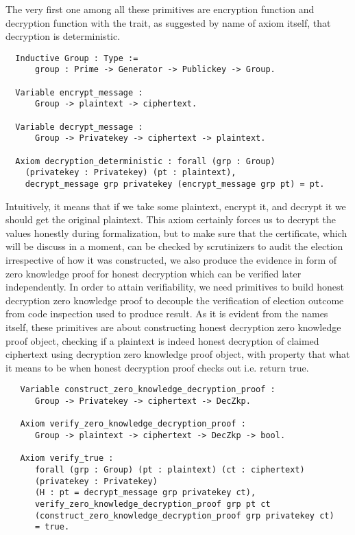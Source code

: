 \documentclass{llncs}
\begin{document}
 The very first one among all these primitives 
are encryption function and decryption function with the trait, as suggested 
by name of axiom itself, that decryption is deterministic. 

\begin{verbatim}
  Inductive Group : Type :=
      group : Prime -> Generator -> Publickey -> Group. 

  Variable encrypt_message :
      Group -> plaintext -> ciphertext.
      
  Variable decrypt_message :
      Group -> Privatekey -> ciphertext -> plaintext.
 
  Axiom decryption_deterministic : forall (grp : Group) 
    (privatekey : Privatekey) (pt : plaintext), 
    decrypt_message grp privatekey (encrypt_message grp pt) = pt.
 \end{verbatim}
 
 Intuitively, it means that if we take some plaintext, encrypt it, and decrypt it 
 we should get the original plaintext. This axiom certainly forces us to decrypt
  the values 
 honestly during formalization, but to make sure that the certificate, which 
 will be discuss in a moment, can be checked 
 by scrutinizers to audit the election irrespective of how it was constructed, 
 we also produce the evidence in form of zero knowledge proof for honest decryption which
 can be verified later independently. In order to attain verifiability, 
 we need primitives to build 
 honest decryption zero knowledge proof to decouple the verification of election 
 outcome from code inspection used to produce result.
 As it is evident from the names itself, these primitives are about constructing honest
 decryption zero knowledge proof object, checking if a plaintext is indeed 
 honest decryption of claimed ciphertext using decryption zero knowledge proof object, 
 with property that what it means to be when honest decryption proof 
 checks out i.e. return true.
 
 \begin{verbatim}
   Variable construct_zero_knowledge_decryption_proof :
      Group -> Privatekey -> ciphertext -> DecZkp.

   Axiom verify_zero_knowledge_decryption_proof :
      Group -> plaintext -> ciphertext -> DecZkp -> bool. 
   
   Axiom verify_true :
      forall (grp : Group) (pt : plaintext) (ct : ciphertext) 
      (privatekey : Privatekey)
      (H : pt = decrypt_message grp privatekey ct),
      verify_zero_knowledge_decryption_proof grp pt ct
      (construct_zero_knowledge_decryption_proof grp privatekey ct) 
      = true.
 \end{verbatim}
 
\end{document}

